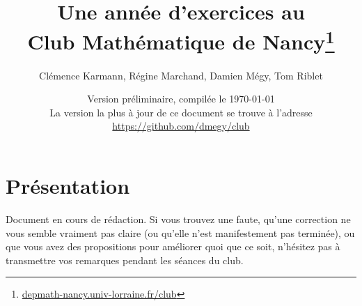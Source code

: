 

\newcommand*{\etoile}
{
\begin{center}
$\star$\par
$\star$\hspace*{3ex}$\star$
\end{center}
}



\usepackage{fontawesome}




\debut %


\title{Une année d'exercices au \\ Club Mathématique de Nancy\footnote{\url{depmath-nancy.univ-lorraine.fr/club}}\\ \faCogs}
\author{Clémence Karmann, Régine Marchand, Damien Mégy, Tom Riblet}
\date{Version préliminaire, compilée le \today\\ La version la plus à jour de ce document se trouve à l'adresse \url{https://github.com/dmegy/club}}
\maketitle

\begin{multicols}{2}
\tableofcontents
\end{multicols}


\chapter*{Présentation}

Document en cours de rédaction. Si vous trouvez une faute, qu'une correction ne vous semble vraiment pas claire (ou qu'elle n'est manifestement pas terminée), ou que vous avez des propositions pour améliorer quoi que ce soit, n'hésitez pas à transmettre vos remarques pendant les séances du club.


